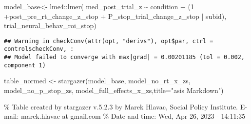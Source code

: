 \documentclass[
]{article}
\newenvironment{Shaded}{\begin{snugshade}}{\end{snugshade}}
\newcommand{\AttributeTok}[1]{\textcolor[rgb]{0.77,0.63,0.00}{#1}}
\newcommand{\DecValTok}[1]{\textcolor[rgb]{0.00,0.00,0.81}{#1}}
\newcommand{\FunctionTok}[1]{\textcolor[rgb]{0.00,0.00,0.00}{#1}}
\newcommand{\NormalTok}[1]{#1}
\newcommand{\OtherTok}[1]{\textcolor[rgb]{0.56,0.35,0.01}{#1}}
\newcommand{\SpecialCharTok}[1]{\textcolor[rgb]{0.00,0.00,0.00}{#1}}
\newcommand{\StringTok}[1]{\textcolor[rgb]{0.31,0.60,0.02}{#1}}
\begin{document}
\begin{Shaded}
\begin{Highlighting}[]
\NormalTok{model\_base}\OtherTok{\textless{}{-}}\NormalTok{ lme4}\SpecialCharTok{::}\FunctionTok{lmer}\NormalTok{(}
\NormalTok{   med\_post\_trial\_z }\SpecialCharTok{\textasciitilde{}}\NormalTok{ condition }\SpecialCharTok{+}\NormalTok{ (}\DecValTok{1} \SpecialCharTok{+}\NormalTok{post\_pre\_rt\_change\_z\_stop  }\SpecialCharTok{+}\NormalTok{ P\_stop\_trial\_change\_z\_stop  }\SpecialCharTok{|}\NormalTok{ subid),}
\NormalTok{  trial\_neural\_behav\_roi\_stop)}
\end{Highlighting}
\end{Shaded}

\begin{verbatim}
## Warning in checkConv(attr(opt, "derivs"), opt$par, ctrl = control$checkConv, :
## Model failed to converge with max|grad| = 0.00201185 (tol = 0.002, component 1)
\end{verbatim}

\begin{Shaded}
\begin{Highlighting}[]
\NormalTok{table\_normed }\OtherTok{\textless{}{-}} \FunctionTok{stargazer}\NormalTok{(model\_base, model\_no\_rt\_x\_zs, model\_no\_p\_stop\_zs, model\_full\_effects\_x\_zs,}\AttributeTok{title=}\StringTok{"asis Markdown"}\NormalTok{)}
\end{Highlighting}
\end{Shaded}

\% Table created by stargazer v.5.2.3 by Marek Hlavac, Social Policy
Institute. E-mail: marek.hlavac at gmail.com \% Date and time: Wed, Apr
26, 2023 - 14:11:35
\end{document}
